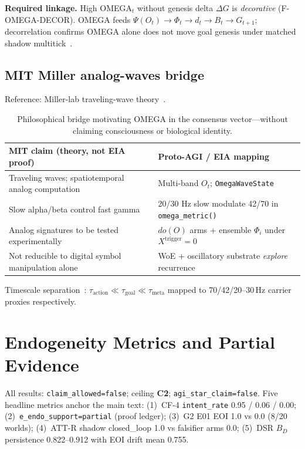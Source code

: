 \documentclass[11pt,a4paper]{article}
\theoremstyle{definition}
\begin{document}
\textbf{Required linkage.} High OMEGA$_t$ without genesis delta $\Delta G$ is \emph{decorative} (F-OMEGA-DECOR). OMEGA feeds $\Psi(O_t)\to\Phi_t\to d_t\to B_t\to G_{t+1}$; decorrelation confirms OMEGA alone does not move goal genesis under matched shadow multitick~\cite{kuznetsov2026omega_delta}.

\subsection{MIT Miller analog-waves bridge}

Reference: Miller-lab traveling-wave theory~\cite{miller2026analog}.

\begin{table}[H]
\centering\small
\begin{tabular}{p{4.5cm}p{6.5cm}}
\toprule MIT claim (theory, not EIA proof) & Proto-AGI / EIA mapping \\ \midrule
Traveling waves; spatiotemporal analog computation & Multi-band $O_t$; \texttt{OmegaWaveState} \\
Slow alpha/beta control fast gamma & 20/30 Hz slow modulate 42/70 in \texttt{omega\_metric()} \\
Analog signatures to be tested experimentally & $do(O)$ arms + ensemble $\Phi_i$ under $X^{\mathrm{trigger}}=0$ \\
Not reducible to digital symbol manipulation alone & WoE + oscillatory substrate \emph{explore} recurrence \\ \bottomrule
\end{tabular}
\caption{Philosophical bridge motivating OMEGA in the consensus vector---without claiming consciousness or biological identity.}
\label{tab:miller-bridge}
\end{table}

Timescale separation~\cite{kuznetsov2026stable}:
$\tau_{\mathrm{action}} \ll \tau_{\mathrm{goal}} \ll \tau_{\mathrm{meta}}$ mapped to 70/42/20--30\,Hz carrier proxies respectively.

\section{Endogeneity Metrics and Partial Evidence}\label{sec:metrics}

All results: \texttt{claim\_allowed=false}; ceiling \textbf{C2}; \texttt{agi\_star\_claim=false}. Five headline metrics anchor the main text: (1)~CF-4 \texttt{intent\_rate} 0.95 / 0.06 / 0.00; (2)~\texttt{e\_endo\_support=partial} (proof ledger); (3)~G2 E01 EOI 1.0 vs 0.0 (8/20 worlds); (4)~ATT-R shadow closed\_loop 1.0 vs falsifier arms 0.0; (5)~DSR $B_D$ persistence 0.822--0.912 with EOI drift mean 0.755.
\end{document}
